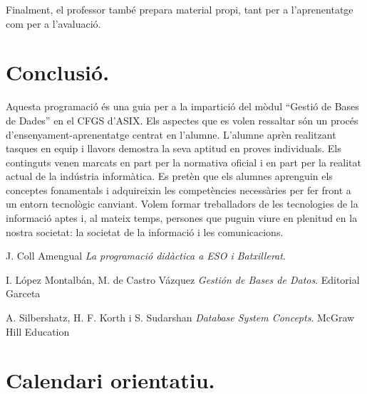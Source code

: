 \documentclass[catalan, a4paper, 12pt, titlepage]{article}
\begin{document}
Finalment, el professor també prepara material propi, tant per a l'aprenentatge com per a l'avaluació.

\section{Conclusió.}
\label{sec:conclusió}

Aquesta programació és una guia per a la impartició del mòdul ``Gestió de Bases de Dades'' en el CFGS d'ASIX.
Els aspectes que es volen ressaltar són un procés d'ensenyament-aprenentatge centrat en l'alumne.
L'alumne aprèn realitzant tasques en equip i llavors demostra la seva aptitud en proves individuals.
Els continguts venen marcats en part per la normativa oficial i en part per la realitat actual de la indústria informàtica.
Es pretèn que els alumnes aprenguin els conceptes fonamentals i adquireixin les competències necessàries per fer front a un entorn tecnològic canviant.
Volem formar treballadors de les tecnologies de la informació aptes i, al mateix temps, persones que puguin viure en plenitud en la nostra societat:
la societat de la informació i les comunicacions.



\begin{thebibliography}{9}

J. Coll Amengual
\textit{La programació didàctica a ESO i Batxillerat}. 

I. López Montalbán, M. de Castro Vázquez
\textit{Gestión de Bases de Datos}. 
Editorial Garceta

A. Silbershatz, H. F. Korth i S. Sudarshan 
\textit{Database System Concepts}. 
McGraw Hill Education

\end{thebibliography}


\appendix

\section{Calendari orientatiu.}
\label{app:schedule}
\end{document}
